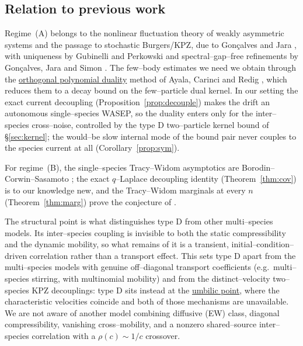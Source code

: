 \documentclass[11pt]{article}
\theoremstyle{plain}
\theoremstyle{definition}
\theoremstyle{remark}
\begin{document}
\subsection{Relation to previous work}\label{sec:introlit}
Regime~(A) belongs to the nonlinear fluctuation theory of weakly asymmetric systems and
the passage to stochastic Burgers/KPZ, due to Gon\c{c}alves and Jara \cite{GJ}, with
uniqueness by Gubinelli and Perkowski \cite{GP} and spectral--gap--free refinements by
Gon\c{c}alves, Jara and Simon \cite{GJS}. The few--body estimates we need we obtain
through the \underline{orthogonal polynomial duality} method of Ayala, Carinci and Redig
\cite{ACR,ACR2}, which reduces them to a decay bound on the few--particle dual kernel. In
our setting the exact current decoupling (Proposition~\ref{prop:decouple}) makes the
drift an autonomous single--species WASEP, so the duality enters only for the
inter--species cross--noise, controlled by the type D two--particle kernel bound of
\S\ref{sec:kernel}; the would--be slow internal mode of the bound pair never couples to
the species current at all (Corollary~\ref{prop:sym}).

For regime~(B), the single--species Tracy--Widom asymptotics are
Borodin--Corwin--Sasamoto \cite{BCS}; the exact $q$--Laplace decoupling identity
(Theorem~\ref{thm:cov}) is to our knowledge new, and the Tracy--Widom marginals at
every $n$ (Theorem~\ref{thm:marg}) prove the conjecture of \cite[\S3.1.1]{REU}.

The structural point is what distinguishes type D from other multi--species models. Its
inter--species coupling is invisible to both the static compressibility and the dynamic
mobility, so what remains of it is a transient, initial--condition--driven correlation
rather than a transport effect. This sets type D apart from the multi--species models
with genuine off--diagonal transport coefficients (e.g.\ multi--species stirring, with
multinomial mobility) and from the distinct--velocity two--species KPZ decouplings:
type D sits instead at the \underline{umbilic point}, where the characteristic velocities
coincide and both of those mechanisms are unavailable. We are not aware of another
model combining diffusive (EW) class, diagonal compressibility, vanishing
cross--mobility, and a nonzero shared--source inter--species correlation with a
$\rho(c)\sim1/c$ crossover.
\end{document}
